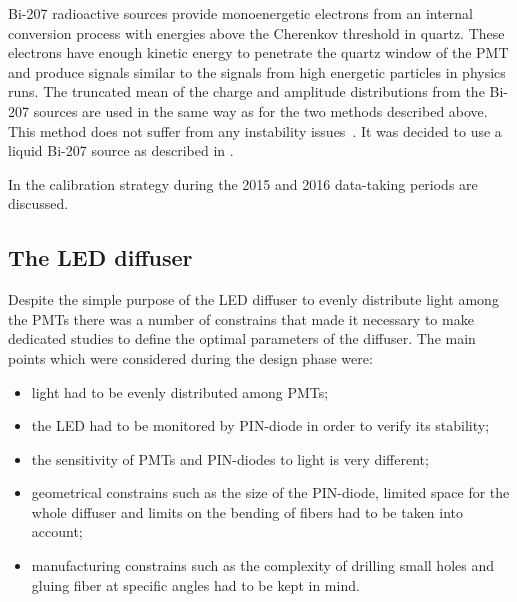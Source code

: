 Bi-207 radioactive sources provide monoenergetic electrons from an internal conversion process with energies 
above the Cherenkov threshold in quartz. These electrons
have enough kinetic energy to penetrate the quartz window of the PMT and produce signals similar to the signals 
from high energetic particles in physics runs. The truncated mean of the charge and amplitude 
distributions from the Bi-207 sources are used in the same way as for the two methods described above. 
This method does not suffer from any instability issues~\cite{Alberghi:2016tad}.
It was decided to use a liquid Bi-207 source as described in .

In  the calibration strategy during the  2015 and 2016 data-taking periods are discussed.

\subsection{The LED diffuser}
\label{subsec:LEDDiffuser}



Despite the simple purpose of the LED diffuser to evenly distribute light among the PMTs 
there was a number of constrains that made it necessary to make dedicated studies 
to define the optimal parameters of the diffuser. The main points which were considered during the design phase were:
\begin{itemize}
 \item light had to be evenly distributed among PMTs;
 \item the LED had to be monitored by PIN-diode in order to verify its stability;
 \item the sensitivity of PMTs and PIN-diodes to light is very different;
 \item geometrical constrains such as the size of the PIN-diode, 
       limited space for the whole diffuser and limits on the bending of fibers had to be taken into account;
 \item manufacturing constrains such as the complexity of drilling small holes and gluing fiber at specific angles had to be kept in mind.
\end{itemize}

